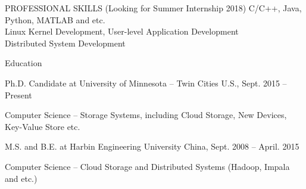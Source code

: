 \documentclass{resume} %
\begin{document}

\begin{rSection}{PROFESSIONAL SKILLS (Looking for Summer Internship 2018)}
C/C++, Java, Python, MATLAB and etc. \\
Linux Kernel Development, User-level Application Development\\
Distributed System Development 
\end{rSection}

\begin{rSection}{Education}

\begin{rSubsection}{Ph.D. Candidate at University of Minnesota -- Twin Cities} {U.S., Sept. 2015 -- Present} {} {}
\item Computer Science -- Storage Systems, including Cloud Storage, New Devices, Key-Value Store etc.
\end{rSubsection}

\begin{rSubsection}{M.S. and B.E. at Harbin Engineering University} {China, Sept. 2008 -- April. 2015} {} {}
\item Computer Science -- Cloud Storage and Distributed Systems (Hadoop, Impala and etc.)
\end{rSubsection}

\end{rSection}
\end{document}
